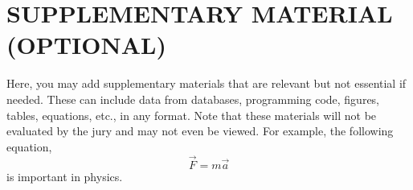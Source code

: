 \documentclass[twocolumn]{revtex4}
\begin{document}
\clearpage
\twocolumngrid
\appendix
\section{SUPPLEMENTARY MATERIAL (OPTIONAL)}

Here, you may add supplementary materials that are relevant but not essential if needed. These can include data from databases, programming code, figures, tables, equations, etc., in any format. Note that these materials will not be evaluated by the jury and may not even be viewed. For example, the following equation,
\begin{equation} 
\vec{F}=m \vec{a} 
\end{equation}
is important in physics.
\end{document}
